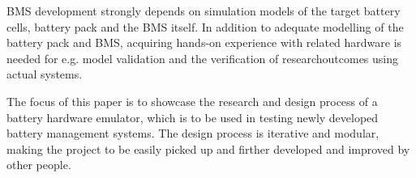 BMS development strongly depends on simulation models of the target
battery cells, battery pack and the BMS itself. In addition to adequate modelling 
of the battery pack and BMS, acquiring hands-on experience with related
hardware is needed for e.g. model validation and the verification of 
researchoutcomes using actual systems.

The focus of this paper is to showcase the research and design process of 
a battery hardware emulator, which is to be used in testing newly developed 
battery management systems. The design process is iterative and modular, 
making the project to be easily picked up and firther developed and improved 
by other people.  